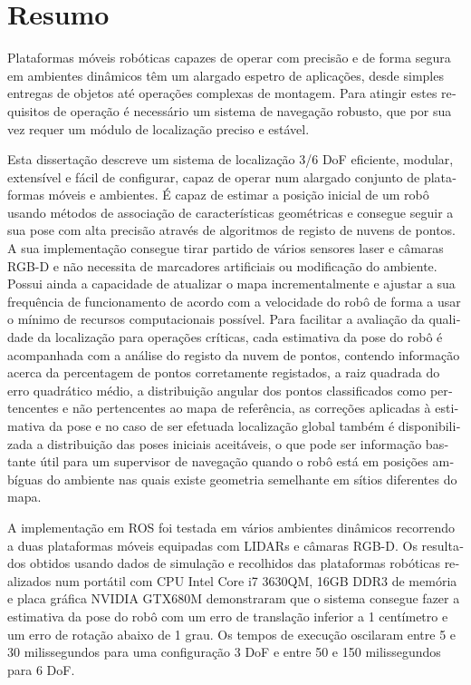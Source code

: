 \chapter*{Resumo}

\begin{otherlanguage}{portuguese}

Plataformas móveis robóticas capazes de operar com precisão e de forma segura em ambientes dinâmicos têm um alargado espetro de aplicações, desde simples entregas de objetos até operações complexas de montagem. Para atingir estes requisitos de operação é necessário um sistema de navegação robusto, que por sua vez requer um módulo de localização preciso e estável.

Esta dissertação descreve um sistema de localização 3/6 DoF eficiente, modular, extensível e fácil de configurar, capaz de operar num alargado conjunto de plataformas móveis e ambientes. É capaz de estimar a posição inicial de um robô usando métodos de associação de características geométricas e consegue seguir a sua pose com alta precisão através de algoritmos de registo de nuvens de pontos. A sua implementação consegue tirar partido de vários sensores laser e câmaras RGB-D e não necessita de marcadores artificiais ou modificação do ambiente. Possui ainda a capacidade de atualizar o mapa incrementalmente e ajustar a sua frequência de funcionamento de acordo com a velocidade do robô de forma a usar o mínimo de recursos computacionais possível. Para facilitar a avaliação da qualidade da localização para operações críticas, cada estimativa da pose do robô é acompanhada com a análise do registo da nuvem de pontos, contendo informação acerca da percentagem de pontos corretamente registados, a raiz quadrada do erro quadrático médio, a distribuição angular dos pontos classificados como pertencentes e não pertencentes ao mapa de referência, as correções aplicadas à estimativa da pose e no caso de ser efetuada localização global também é disponibilizada a distribuição das poses iniciais aceitáveis, o que pode ser informação bastante útil para um supervisor de navegação quando o robô está em posições ambíguas do ambiente nas quais existe geometria semelhante em sítios diferentes do mapa.

A implementação em ROS foi testada em vários ambientes dinâmicos recorrendo a duas plataformas móveis equipadas com LIDARs e câmaras RGB-D. Os resultados obtidos usando dados de simulação e recolhidos das plataformas robóticas realizados num portátil com CPU Intel Core i7 3630QM, 16GB DDR3 de memória e placa gráfica NVIDIA GTX680M demonstraram que o sistema consegue fazer a estimativa da pose do robô com um erro de translação inferior a 1 centímetro e um erro de rotação abaixo de 1 grau. Os tempos de execução oscilaram entre 5 e 30 milissegundos para uma configuração 3 DoF e entre 50 e 150 milissegundos para 6 DoF.


\end{otherlanguage}
